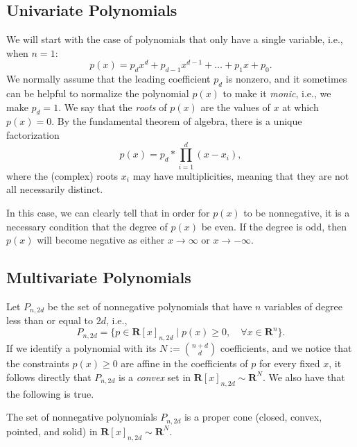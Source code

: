	\subsection{Univariate Polynomials}
	
	We will start with the case of polynomials that only have a single variable, i.e., when $n = 1$:
	\begin{equation} \label{univariate polynomial}
		p(x) = p_d x^d + p_{d-1} x^{d-1} + \dots + p_1 x + p_0.
	\end{equation}
	We normally assume that the leading coefficient $p_d$ is nonzero, and it sometimes can be helpful to normalize the polynomial $p(x)$ to make it \emph{monic}, i.e., we make $p_d = 1$. We say that the \emph{roots} of $p(x)$ are the values of $x$ at which $p(x) = 0$. By the fundamental theorem of algebra, there is a unique factorization
	\begin{equation}
		p(x) = p_d * \prod\limits_{i=1}^{d} (x - x_i), 
	\end{equation}
	where the (complex) roots $x_i$ may have multiplicities, meaning that they are not all necessarily distinct.
	
	In this case, we can clearly tell that in order for $p(x)$ to be nonnegative, it is a necessary condition that the degree of $p(x)$ be even. If the degree is odd, then $p(x)$ will become negative as either $x \rightarrow \infty$ or $x \rightarrow -\infty$. 

	\subsection{Multivariate Polynomials}
	
	Let $P_{n, 2d}$ be the set of nonnegative polynomials that have $n$ variables of degree less than or equal to $2d$, i.e.,
	$$
		P_{n, 2d} = \{p \in \mathbf{R}[x]_{n, 2d} \mid p(x) \geq 0, \quad \forall x \in \mathbf{R}^n \}.
	$$
	If we identify a polynomial with its $N := \binom{n+d}{d}$ coefficients, and we notice that the constraints $p(x) \geq 0$ are affine in the coefficients of $p$ for every fixed $x$, it follows directly that $P_{n, 2d}$ is a \emph{convex} set in $\mathbf{R}[x]_{n, 2d} \sim \mathbf{R}^N$. We also have that the following is true.
	
	\begin{theorem}
		The set of nonnegative polynomials $P_{n, 2d}$ is a proper cone (closed, convex, pointed, and solid) in $\mathbf{R}[x]_{n, 2d} \sim \mathbf{R}^N$. 
	\end{theorem}
	
